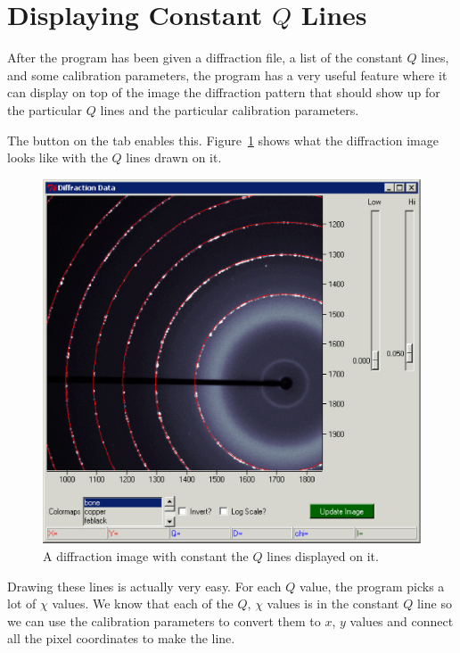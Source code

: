 \section{\texorpdfstring{Displaying Constant $Q$ 
    Lines}{Displaying Constant Q Lines}}
    \label{displayconstQlines}

After the program has been given a diffraction file,
a list of the constant $Q$ lines, and some
calibration parameters, the program has a very
useful feature where it can display on top of
the image the diffraction pattern that should
show up for the particular $Q$ lines and the
particular calibration parameters.

The  button on the 
 tab enables this.
Figure~\ref{constant_q_lines_on_diffraction_image}
shows what the diffraction image looks like with
the $Q$ lines drawn on it.

\begin{figure}
    \centering
    \includegraphics[scale=.75]{figures/constant_q_lines_on_diffraction_image.eps}
    \caption{A diffraction image with constant the 
    $Q$ lines displayed on it.}
    \label{constant_q_lines_on_diffraction_image}
\end{figure}

Drawing these lines is actually very easy. For
each $Q$ value, the program picks a lot of
$\chi$ values. We know that each of the $Q$, $\chi$
values is in the constant $Q$ line so we can use
the calibration parameters to convert them to $x$, $y$
values and connect all the pixel coordinates to 
make the line.

